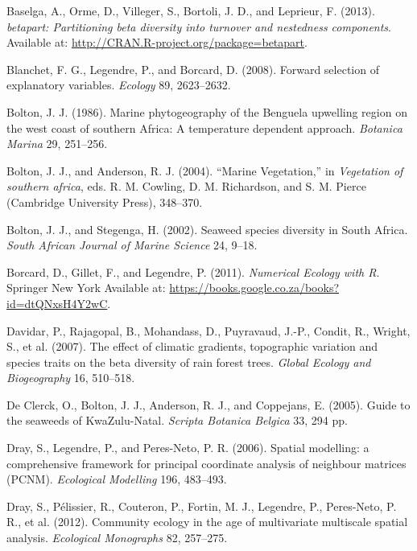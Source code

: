 \documentclass[10pt,A4,]{article}
\begin{document}
\hypertarget{ref-Baselga2013}{}
Baselga, A., Orme, D., Villeger, S., Bortoli, J. D., and Leprieur, F.
(2013). \emph{betapart: Partitioning beta diversity into turnover and
nestedness components}. Available at:
\url{http://CRAN.R-project.org/package=betapart}.

\hypertarget{ref-Blanchet2008}{}
Blanchet, F. G., Legendre, P., and Borcard, D. (2008). Forward selection
of explanatory variables. \emph{Ecology} 89, 2623--2632.

\hypertarget{ref-Bolton1986}{}
Bolton, J. J. (1986). Marine phytogeography of the Benguela upwelling
region on the west coast of southern Africa: A temperature dependent
approach. \emph{Botanica Marina} 29, 251--256.

\hypertarget{ref-Bolton2004}{}
Bolton, J. J., and Anderson, R. J. (2004). ``Marine Vegetation,'' in
\emph{Vegetation of southern africa}, eds. R. M. Cowling, D. M.
Richardson, and S. M. Pierce (Cambridge University Press), 348--370.

\hypertarget{ref-Bolton2002}{}
Bolton, J. J., and Stegenga, H. (2002). Seaweed species diversity in
South Africa. \emph{South African Journal of Marine Science} 24, 9--18.

\hypertarget{ref-Borcard2011}{}
Borcard, D., Gillet, F., and Legendre, P. (2011). \emph{Numerical
Ecology with R}. Springer New York Available at:
\url{https://books.google.co.za/books?id=dtQNxsH4Y2wC}.

\hypertarget{ref-Davidar2007}{}
Davidar, P., Rajagopal, B., Mohandass, D., Puyravaud, J.-P., Condit, R.,
Wright, S., et al. (2007). The effect of climatic gradients, topographic
variation and species traits on the beta diversity of rain forest trees.
\emph{Global Ecology and Biogeography} 16, 510--518.

\hypertarget{ref-DeClerck2005}{}
De Clerck, O., Bolton, J. J., Anderson, R. J., and Coppejans, E. (2005).
Guide to the seaweeds of KwaZulu-Natal. \emph{Scripta Botanica Belgica}
33, 294 pp.

\hypertarget{ref-Dray2006}{}
Dray, S., Legendre, P., and Peres-Neto, P. R. (2006). Spatial modelling:
a comprehensive framework for principal coordinate analysis of neighbour
matrices (PCNM). \emph{Ecological Modelling} 196, 483--493.

\hypertarget{ref-Dray2012a}{}
Dray, S., Pélissier, R., Couteron, P., Fortin, M. J., Legendre, P.,
Peres-Neto, P. R., et al. (2012). Community ecology in the age of
multivariate multiscale spatial analysis. \emph{Ecological Monographs}
82, 257--275.
\end{document}
